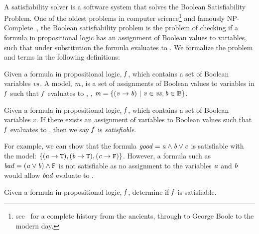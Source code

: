 ~\label{section:sat-solving}

A satisfiability solver is a software system that solves the Boolean
Satisfiability Problem. One of the oldest problems in computer
science\footnote{see~\citet{BBH+09} for a complete history from the ancients,
  through to George Boole to the modern day.} and famously
NP-Complete~\cite{10.1145/800157.805047}, the Boolean satisfiability problem is
the problem of checking if a formula in propositional logic has an assignment of
Boolean values to variables, such that under substitution the formula evaluates
to \tru{}. We formalize the problem and terms in the following definitions:

\begin{definition}[Model]
  Given a formula in propositional logic, $\mathit{f}$, which contains a set of
  Boolean variables $\mathit{vs}$. A model, $\mathit{m}$, is a set of assignments of
  Boolean values to variables in $\mathit{f}$ such that $\mathit{f}$ evaluates to
  \tru{}, \ie{}, $\mathit{m = \{ (v \rightarrow{} b)\ |\ v \in vs, b \in
    \mathbb{B}} \}$.
\end{definition}

\begin{definition}[Satisfiable]
  Given a formula in propositional logic, $\mathit{f}$, which contains a set of
  Boolean variables $v$. If there exists an assignment of variables to Boolean
  values such that $\mathit{f}$ evaluates to \tru{}, then we say $\mathit{f}$ is
  \emph{satisfiable}.
\end{definition}

For example, we can show that the formula $\mathit{good = a \wedge b \vee c}$ is
satisfiable with the model: $\{\mathit{(a \rightarrow{} \texttt{T}{}), (b \rightarrow{}
  \texttt{T}{}), (c \rightarrow{} \texttt{F}{})}\}$. However, a formula such as $\mathit{bad =
  (a \vee b) \wedge \texttt{F}{}}$ is not satisfiable as no assignment to the
variables $\mathit{a}$ and $\mathit{b}$ would allow $\mathit{bad}$ evaluate to \tru{}.

\begin{definition}
  Given a formula in propositional logic, $\mathit{f}$, determine if $\mathit{f}$ is
  satisfiable.
\end{definition}


